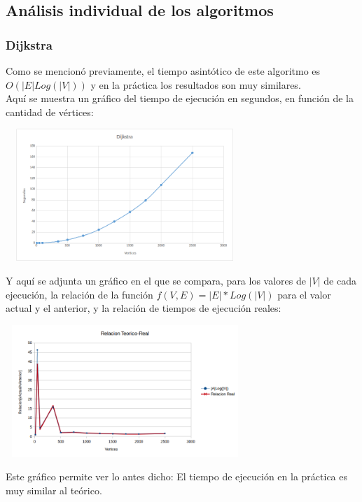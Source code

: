 \documentclass{article}
\newcommand\tab[1][0.5cm]{\hspace*{#1}}
\begin{document}
        \subsection{Análisis individual de los algoritmos}

            \subsubsection{Dijkstra}
            \tab Como se mencionó previamente, el tiempo asintótico de este algoritmo es $O(|E|Log(|V|))$ y en la
            práctica los resultados son muy similares. \\
            \tab Aquí se muestra un gráfico del tiempo de ejecución en segundos, en función de la cantidad de vértices:
            \begin{center}
                \includegraphics[width=9cm, height=5cm]{images/GraficoDijkstra}
            \end{center}
            \tab Y aquí se adjunta un gráfico en el que se compara, para los valores de $|V|$ de cada ejecución,
            la relación de la función $f(V, E) = |E|*Log(|V|)$ para el valor actual y el anterior, y la relación de
            tiempos de ejecución reales:
            \begin{center}
                \includegraphics[width=9cm, height=5cm]{images/RelacionDijkstra}
            \end{center}
            \tab Este gráfico permite ver lo antes dicho: El tiempo de ejecución en la práctica es muy similar
            al teórico.
\end{document}
